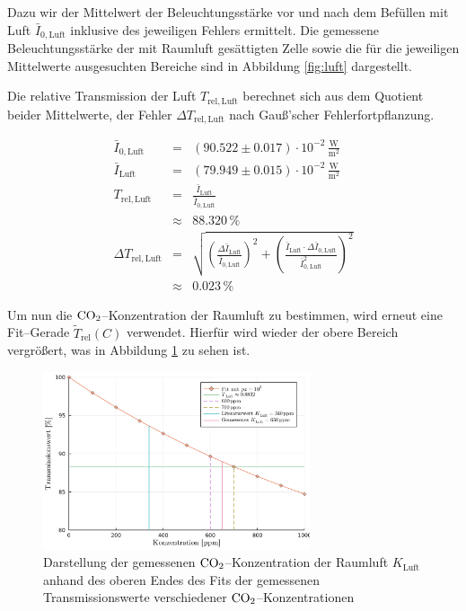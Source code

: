 \documentclass[12pt,a4paper]{scrartcl}
\numberwithin{equation}{section} %
\begin{document}
Dazu wir der Mittelwert der Beleuchtungsstärke vor und nach dem Befüllen mit Luft $\bar{I}_{0, \mathrm{Luft}}$ inklusive des jeweiligen Fehlers ermittelt. Die gemessene Beleuchtungsstärke der mit Raumluft gesättigten Zelle  sowie die für die jeweiligen Mittelwerte ausgesuchten Bereiche sind in Abbildung \ref{fig:luft} dargestellt.

Die relative Transmission der Luft $T_\mathrm{rel, Luft}$ berechnet sich aus dem Quotient beider Mittelwerte, der Fehler $\Delta T_\mathrm{rel, Luft}$ nach Gauß'scher Fehlerfortpflanzung.

\begin{eqnarray}
	\bar{I}_{0, \mathrm{Luft}} &=& (90.522\pm 0.017) \cdot 10^{-2} \mathrm{\,\frac{W}{m^2}}\\
	\bar{I}_\mathrm{Luft} &=& (79.949 \pm 0.015) \cdot 10^{-2} \mathrm{\, \frac{W}{m^2}} \\
	T_\mathrm{rel, Luft} &=& \frac{\bar{I}_\mathrm{Luft}}{\bar{I}_{0, \mathrm{Luft}}} \\
		&\approx& 88.320 \mathrm{\, \%} \\
	\Delta T_\mathrm{rel, Luft} &=&
		\sqrt{
			\left(
				\frac{\Delta \bar{I}_\mathrm{Luft}}{\bar{I}_{0, \mathrm{Luft}}}
			\right)^2
			+ \left(
				\frac{\bar{I}_\mathrm{Luft} \cdot \Delta \bar{I}_{0, \mathrm{Luft}}}{\bar{I}_{0, \mathrm{Luft}}^2}
			\right)^2
		} \\
	&\approx& 0.023 \mathrm{\, \%}
\end{eqnarray}

\noindent
Um nun die $\ce{CO_2}$--Konzentration der Raumluft zu bestimmen, wird erneut eine Fit--Gerade $\tilde{T}_\mathrm{rel}(C)$ verwendet. Hierfür wird wieder der obere Bereich vergrößert, was in Abbildung \ref{fig:luftZoom} zu sehen ist.

\begin{figure}[h!]
	\centering
	\includegraphics[width=0.7\textwidth]{../media/B1.1/luftZoomPpm.pdf}
	\caption{Darstellung der gemessenen $\ce{CO_2}$--Konzentration der Raumluft $K_\mathrm{Luft}$ anhand des oberen Endes des Fits der gemessenen Transmissionswerte verschiedener $\ce{CO_2}$--Konzentrationen}
	\label{fig:luftZoom}
\end{figure}
\end{document}
